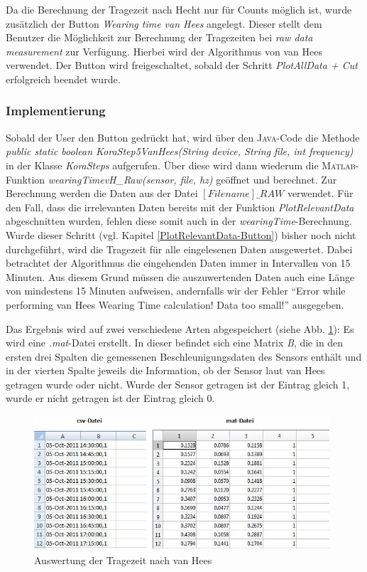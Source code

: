 \documentclass[onecolumn,german]{article}
\begin{document}
Da die Berechnung der Tragezeit nach Hecht nur für Counts möglich ist, wurde zusätzlich der Button \textit{Wearing time van Hees} angelegt. Dieser stellt dem Benutzer die Möglichkeit zur Berechnung der Tragezeiten bei \textit{raw data measurement} zur Verfügung. Hierbei wird der Algorithmus von van Hees verwendet. Der Button wird freigeschaltet, sobald der Schritt \textit{PlotAllData + Cut} erfolgreich beendet wurde.

\subsubsection{Implementierung}
Sobald der User den Button gedrückt hat, wird über den \textsc{Java}-Code die Methode \textit{public static boolean KoraStep5VanHees(String device, String file, int frequency)} in der Klasse \textit{KoraSteps} aufgerufen. Über diese wird dann wiederum die \textsc{Matlab}-Funktion \textit{wearingTimevH\_Raw(sensor, file, hz)} geöffnet und berechnet. Zur Berechnung werden die Daten aus der Datei {$[Filename]\_RAW$} verwendet. Für den Fall, dass die irrelevanten Daten bereits mit der Funktion \textit{PlotRelevantData} abgeschnitten wurden, fehlen diese somit auch in der \textit{wearingTime}-Berechnung. Wurde dieser Schritt (vgl. Kapitel \ref{PlotRelevantData-Button}) bisher noch nicht durchgeführt, wird die Tragezeit für alle eingelesenen Daten ausgewertet. Dabei betrachtet der Algorithmus die eingehenden Daten immer in Intervallen von 15 Minuten. Aus diesem Grund müssen die auszuwertenden Daten auch eine Länge von mindestens 15 Minuten aufweisen, andernfalls wir der Fehler ``Error while performing van Hees Wearing Time calculation! Data too small!'' ausgegeben.\newline

Das Ergebnis wird auf zwei verschiedene Arten abgespeichert (siehe Abb. \ref{vH}): Es wird eine \textit{.mat}-Datei erstellt. In dieser befindet sich eine Matrix \textit{B}, die in den ersten drei Spalten die gemessenen Beschleunigungsdaten des Sensors enthält und in der vierten Spalte jeweils die Information, ob der Sensor laut van Hees getragen wurde oder nicht. Wurde der Sensor getragen ist der Eintrag gleich 1, wurde er nicht getragen ist der Eintrag gleich 0.\newline

\begin{figure}[H]
\centerline{
\includegraphics[width=110mm, height=50mm]{Abbildungen/wearingTimevH_csv_mat.JPG}
}
\caption {Auswertung der Tragezeit nach van Hees}
\label{vH}
\end{figure}
\end{document}
